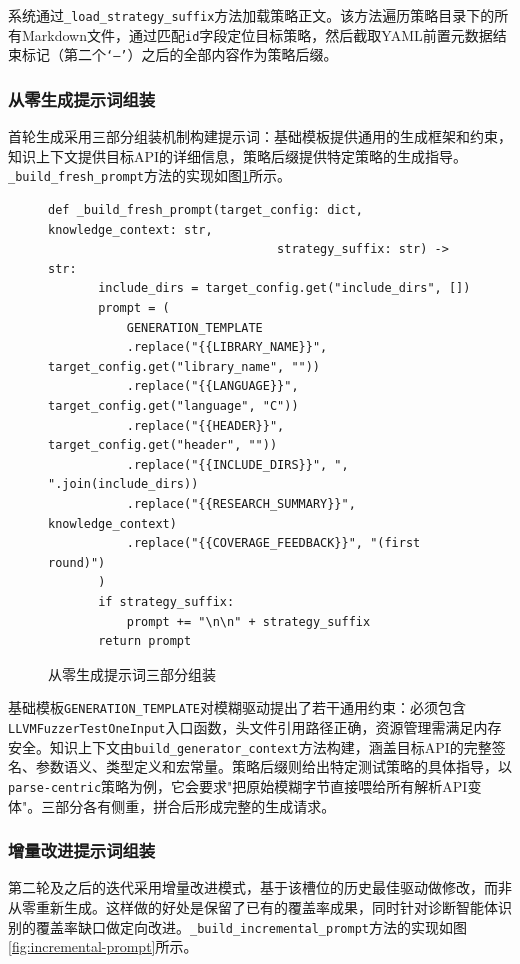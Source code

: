 系统通过\texttt{\_load\_strategy\_suffix}方法加载策略正文。该方法遍历策略目录下的所有Markdown文件，通过匹配\texttt{id}字段定位目标策略，然后截取YAML前置元数据结束标记（第二个\texttt{‘---’}）之后的全部内容作为策略后缀。

\subsubsection{从零生成提示词组装}

首轮生成采用三部分组装机制构建提示词：基础模板提供通用的生成框架和约束，知识上下文提供目标API的详细信息，策略后缀提供特定策略的生成指导。\texttt{\_build\_fresh\_prompt}方法的实现如图\ref{fig:fresh-prompt}所示。

\begin{figure}[H]
    \centering
    \begin{lstlisting}[style=style@python]
   def _build_fresh_prompt(target_config: dict, knowledge_context: str,
                                strategy_suffix: str) -> str:
       include_dirs = target_config.get("include_dirs", [])
       prompt = (
           GENERATION_TEMPLATE
           .replace("{{LIBRARY_NAME}}", target_config.get("library_name", ""))
           .replace("{{LANGUAGE}}", target_config.get("language", "C"))
           .replace("{{HEADER}}", target_config.get("header", ""))
           .replace("{{INCLUDE_DIRS}}", ", ".join(include_dirs))
           .replace("{{RESEARCH_SUMMARY}}", knowledge_context)
           .replace("{{COVERAGE_FEEDBACK}}", "(first round)")
       )
       if strategy_suffix:
           prompt += "\n\n" + strategy_suffix
       return prompt
    \end{lstlisting}
    \caption{从零生成提示词三部分组装}
    \label{fig:fresh-prompt}
\end{figure}

基础模板\texttt{GENERATION\_TEMPLATE}对模糊驱动提出了若干通用约束：必须包含\texttt{LLVMFuzzerTestOneInput}入口函数，头文件引用路径正确，资源管理需满足内存安全。知识上下文由\texttt{build\_generator\_context}方法构建，涵盖目标API的完整签名、参数语义、类型定义和宏常量。策略后缀则给出特定测试策略的具体指导，以\texttt{parse-centric}策略为例，它会要求"把原始模糊字节直接喂给所有解析API变体"。三部分各有侧重，拼合后形成完整的生成请求。

\subsubsection{增量改进提示词组装}

第二轮及之后的迭代采用增量改进模式，基于该槽位的历史最佳驱动做修改，而非从零重新生成。这样做的好处是保留了已有的覆盖率成果，同时针对诊断智能体识别的覆盖率缺口做定向改进。\texttt{\_build\_incremental\_prompt}方法的实现如图\ref{fig:incremental-prompt}所示。

